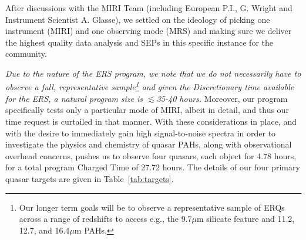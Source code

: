\noindent
After discussions with the MIRI Team (including European P.I.,
G. Wright and Instrument Scientist A. Glasse), we settled on the
ideology of picking one instrument (MIRI) and one observing mode
(MRS) and making sure we deliver the highest quality data analysis and
SEPs in this specific instance for the community. 

\smallskip \smallskip
\noindent
{\it Due to the nature of the ERS program, we note that we do not
necessarily have to observe a full, representative sample\footnote{Our
longer term goals will be to observe a representative sample of ERQs
across a range of redshifts to access e.g., the 9.7$\mu$m silicate
feature and 11.2, 12.7, and 16.4$\mu$m PAHs.} and given the
Discretionary time available for the ERS, a natural program size is
$\lesssim$35-40 hours.}  Moreover, our program specifically tests only
a particular mode of MIRI, albeit in detail, and thus our time request
is curtailed in that manner.  With these considerations in place, and
with the desire to immediately gain high signal-to-noise spectra in
order to investigate the physics and chemistry of quasar PAHs, along
with observational overhead concerns, pushes us to observe four
quasars, 
each object for 4.78 hours, for a total program Charged Time of 27.72 hours.  
The details of our four primary quasar targets are
given in Table~\ref{tab:targets}.

